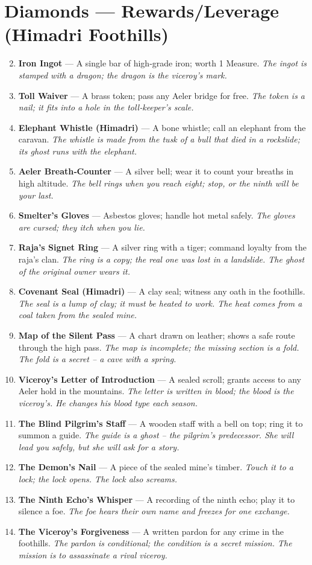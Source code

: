 \documentclass[11pt]{book}
\begin{document}
\section*{Diamonds — Rewards/Leverage (Himadri Foothills)}
\begin{enumerate}
\setcounter{enumi}{1}
\item \textbf{Iron Ingot} — A single bar of high‑grade iron; worth 1 Measure. \textit{The ingot is stamped with a dragon; the dragon is the viceroy’s mark.}
\item \textbf{Toll Waiver} — A brass token; pass any Aeler bridge for free. \textit{The token is a nail; it fits into a hole in the toll‑keeper’s scale.}
\item \textbf{Elephant Whistle (Himadri)} — A bone whistle; call an elephant from the caravan. \textit{The whistle is made from the tusk of a bull that died in a rockslide; its ghost runs with the elephant.}
\item \textbf{Aeler Breath‑Counter} — A silver bell; wear it to count your breaths in high altitude. \textit{The bell rings when you reach eight; stop, or the ninth will be your last.}
\item \textbf{Smelter’s Gloves} — Asbestos gloves; handle hot metal safely. \textit{The gloves are cursed; they itch when you lie.}
\item \textbf{Raja’s Signet Ring} — A silver ring with a tiger; command loyalty from the raja’s clan. \textit{The ring is a copy; the real one was lost in a landslide. The ghost of the original owner wears it.}
\item \textbf{Covenant Seal (Himadri)} — A clay seal; witness any oath in the foothills. \textit{The seal is a lump of clay; it must be heated to work. The heat comes from a coal taken from the sealed mine.}
\item \textbf{Map of the Silent Pass} — A chart drawn on leather; shows a safe route through the high pass. \textit{The map is incomplete; the missing section is a fold. The fold is a secret – a cave with a spring.}
\item \textbf{Viceroy’s Letter of Introduction} — A sealed scroll; grants access to any Aeler hold in the mountains. \textit{The letter is written in blood; the blood is the viceroy’s. He changes his blood type each season.}
\item[J] \textbf{The Blind Pilgrim’s Staff} — A wooden staff with a bell on top; ring it to summon a guide. \textit{The guide is a ghost – the pilgrim’s predecessor. She will lead you safely, but she will ask for a story.}
\item[Q] \textbf{The Demon’s Nail} — A piece of the sealed mine’s timber. \textit{Touch it to a lock; the lock opens. The lock also screams.}
\item[K] \textbf{The Ninth Echo’s Whisper} — A recording of the ninth echo; play it to silence a foe. \textit{The foe hears their own name and freezes for one exchange.}
\item[A] \textbf{The Viceroy’s Forgiveness} — A written pardon for any crime in the foothills. \textit{The pardon is conditional; the condition is a secret mission. The mission is to assassinate a rival viceroy.}
\end{enumerate}
\end{document}

